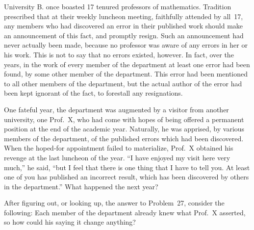  University B. once boasted 17 tenured professors of mathematics.
Tradition prescribed that at their weekly luncheon meeting, faithfully
attended by all~17, any members who had discovered an error in their
published work should make an announcement of this fact, and promptly resign.
Such an announcement had never actually been made, because no professor was
aware of any errors in her or his work. This is not to say that no errors
existed, however. In fact, over the years, in the work of every member of the
department at least one error had been found, by some other member of the
department. This error had been mentioned to all other members of the
department, but the actual author of the error had been kept ignorant of the
fact, to forestall any resignations.

One fateful year, the department was augmented by a visitor from another
university, one Prof.~X, who had come with hopes of being offered a permanent
position at the end of the academic year. Naturally, he was apprised, by
various members of the department, of the published errors which had been
discovered. When the hoped-for appointment failed to materialize, Prof.~X
obtained his revenge at the last luncheon of the year. ``I have enjoyed my
visit here very much,'' he said, ``but I feel that there is one thing that I
have to tell you. At least one of you has published an incorrect result,
which has been discovered by others in the department.'' What happened the
next year?

 After figuring out, or looking up, the answer to Problem~27,
consider the following: Each member of the department already knew what
Prof.~X asserted, so how could his saying it change anything?
